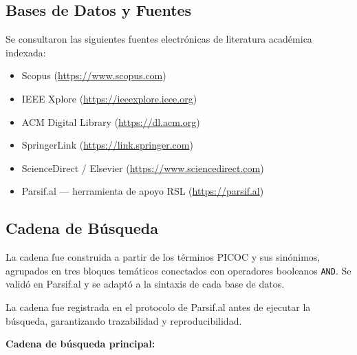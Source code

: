 \documentclass[12pt, a4paper]{article}
\begin{document}
\subsection{Bases de Datos y Fuentes}

Se consultaron las siguientes fuentes electr\'onicas de literatura acad\'emica
indexada:
\begin{itemize}
  \item Scopus (\url{https://www.scopus.com})
  \item IEEE Xplore (\url{https://ieeexplore.ieee.org})
  \item ACM Digital Library (\url{https://dl.acm.org})
  \item SpringerLink (\url{https://link.springer.com})
  \item ScienceDirect / Elsevier (\url{https://www.sciencedirect.com})
  \item Parsif.al --- herramienta de apoyo RSL (\url{https://parsif.al})
\end{itemize}

\subsection{Cadena de B\'usqueda}

La cadena fue construida a partir de los t\'erminos PICOC y sus sin\'onimos,
agrupados en tres bloques tem\'aticos conectados con operadores booleanos
\texttt{AND}. Se valid\'o en Parsif.al y se adapt\'o a la sintaxis de cada
base de datos.

\begin{notamet}
  La cadena fue registrada en el protocolo de Parsif.al antes de ejecutar
  la b\'usqueda, garantizando trazabilidad y reproducibilidad.
\end{notamet}

\vspace{0.5em}
\noindent\textbf{Cadena de b\'usqueda principal:}
\end{document}
